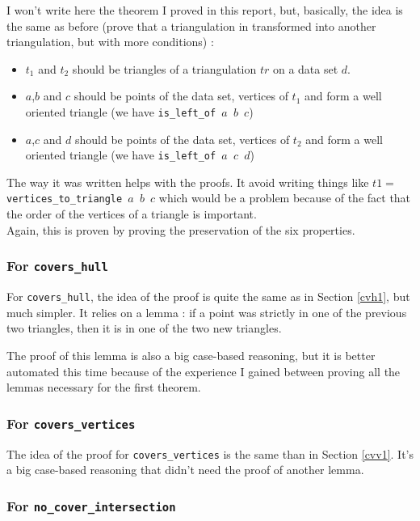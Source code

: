 \documentclass[a4paper,10pt]{article}
\begin{document}
I won't write here the theorem I proved in this report, but, basically, the idea is the same as before (prove that a triangulation in transformed into another triangulation, but with more conditions) :
\begin{itemize}
\item $t_1$ and $t_2$ should be triangles of a triangulation $tr$ on a data set $d$.  
\item $a$,$b$ and $c$ should be points of the data set, vertices of $t_1$ and form a well oriented triangle (we have {\tt is\_left\_of $a$ $b$ $c$})
\item $a$,$c$ and $d$ should be points of the data set, vertices of $t_2$ and form a well oriented triangle (we have {\tt is\_left\_of $a$ $c$ $d$})
\end{itemize}
The way it was written helps with the proofs. It avoid writing things like $t1 = ${\tt vertices\_to\_triangle $a$ $b$ $c$} which would be a problem because of the fact that the order of the vertices of a triangle is important.\\
Again, this is proven by proving the preservation of the six properties.

\subsubsection{For {\tt covers\_hull}} 

For {\tt covers\_hull}, the idea of the proof is quite the same as in Section \ref{cvh1}, but much simpler.
It relies on a lemma : if a point was strictly in one of the previous two triangles, then it is in one of the two new triangles.

The proof of this lemma is also a big case-based reasoning, but it is better automated this time because of the experience I gained between proving all the lemmas necessary for the first theorem.

\subsubsection{For {\tt covers\_vertices}}

The idea of the proof for {\tt covers\_vertices} is the same than in Section \ref{cvv1}. It's a big case-based reasoning that didn't need the proof of another lemma.

\subsubsection{For {\tt no\_cover\_intersection}}
\end{document}

